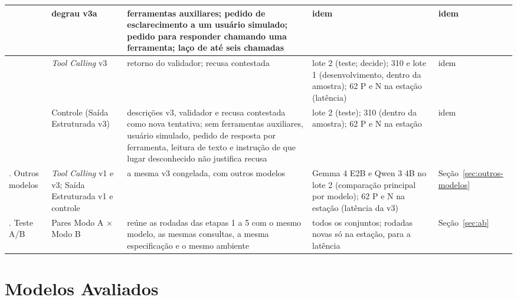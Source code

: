 \begin{quadro}[htbp!]
\begin{tabular}{|>{\raggedright\arraybackslash}p{1.7cm}|>{\raggedright\arraybackslash}p{2.3cm}|>{\raggedright\arraybackslash}p{4.5cm}|>{\raggedright\arraybackslash}p{4.3cm}|>{\raggedright\arraybackslash}p{1.7cm}|}
\cline{2-5}
 & degrau v3a & ferramentas auxiliares; pedido de esclarecimento a um usuário simulado; pedido para responder chamando uma ferramenta; laço de até seis chamadas & idem & idem \\
\cline{2-5}
 & \textit{Tool Calling} v3 & retorno do validador; recusa contestada & lote 2 (teste; decide); 310 e lote 1 (desenvolvimento, dentro da amostra); 62 P e N na estação (latência) & idem \\
\cline{2-5}
 & Controle (Saída Estruturada v3) & descrições v3, validador e recusa contestada como nova tentativa; sem ferramentas auxiliares, usuário simulado, pedido de resposta por ferramenta, leitura de texto e instrução de que lugar desconhecido não justifica recusa & lote 2 (teste); 310 (dentro da amostra); 62 P e N na estação & idem \\
\hline
5. Outros modelos & \textit{Tool Calling} v1 e v3; Saída Estruturada v1 e controle & a mesma v3 congelada, com outros modelos & Gemma 4 E2B e Qwen 3 4B no lote 2 (comparação principal por modelo); 62 P e N na estação (latência da v3) & Seção~\ref{sec:outros-modelos} \\
\hline
6. Teste A/B & Pares Modo A $\times$ Modo B & reúne as rodadas das etapas 1 a 5 com o mesmo modelo, as mesmas consultas, a mesma especificação e o mesmo ambiente & todos os conjuntos; rodadas novas só na estação, para a latência & Seção~\ref{sec:ab} \\
\hline
\end{tabular}%
\end{quadro}

\clearpage
\section{Modelos Avaliados}
\label{sec:selecao-modelos}

